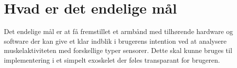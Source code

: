 \section{Hvad er det endelige mål}

Det endelige mål er at få fremstillet et armbånd med tilhørende hardware og software der kan give et klar indblik i brugerens intention ved at analysere muskelaktiviteten med forskellige typer sensorer. Dette skal kunne bruges til implementering i et simpelt exoskelet der føles transparant for brugeren.


%
% 

